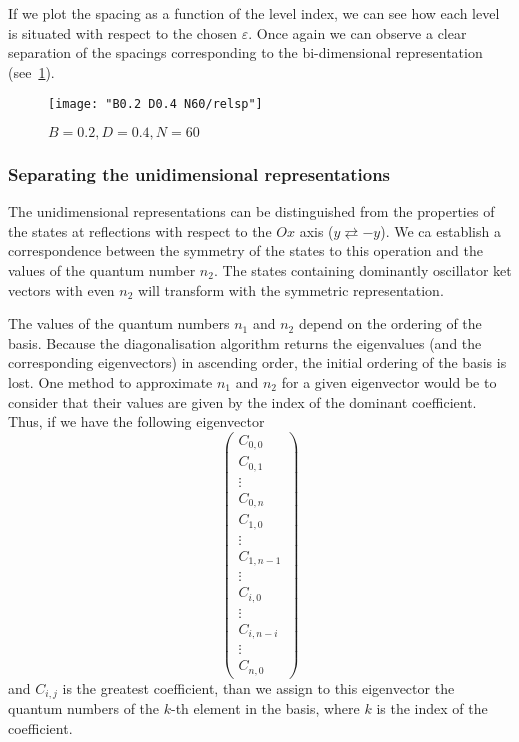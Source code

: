 \documentclass[../thesis.tex]{subfiles}
\begin{document}
If we plot the spacing as a function of the level index, we can see how
each level is situated with respect to the chosen \( \varepsilon \).
Once again we can observe a clear separation of the spacings corresponding to
the bi-dimensional representation (see~\cref{fig:relsp}).

\begin{figure}[h!]
  \centering
  \texttt{[image: "B0.2 D0.4 N60/relsp"]}
  \caption{\(B=0.2, D=0.4, N=60\)}
  \label{fig:relsp}
\end{figure}

\FloatBarrier

\subsubsection{Separating the unidimensional representations}

The unidimensional representations can be distinguished from the properties
of the states at reflections with respect to the \(Ox\) axis
(\(y \rightleftarrows -y\)).
We ca establish a correspondence between the symmetry of the states to
this operation and the values of the quantum number \(n_2\). The states
containing dominantly oscillator ket vectors with even \(n_2\) will
transform with the symmetric representation.

The values of the quantum numbers \(n_1\) and \(n_2\) depend on the ordering of the basis.
Because the diagonalisation algorithm returns the eigenvalues
(and the corresponding eigenvectors) in ascending order,
the initial ordering of the basis is lost.
One method to approximate \(n_1\) and \(n_2\) for a given eigenvector would be
to consider that their values are given by the index of the dominant coefficient.
Thus, if we have the following eigenvector
\[
\begin{pmatrix}
    C_{0,0} \\ C_{0,1} \\ \vdots \\ C_{0,n} \\ C_{1,0} \\ \vdots \\ C_{1,n-1} \\
    \vdots \\ C_{i,0} \\ \vdots \\ C_{i,n-i} \\ \vdots \\ C_{n,0}
  \end{pmatrix}
\]
and \(C_{i,j}\) is the greatest coefficient, than we assign to this eigenvector
the quantum numbers of the \(k\)-th element in the basis, where \(k\) is the
index of the coefficient.
\end{document}

